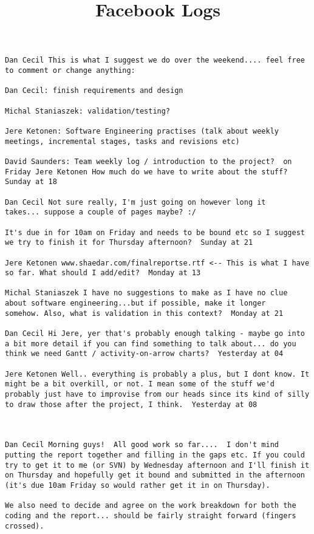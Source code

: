 \documentclass[10pt]{report}
\title{Facebook Logs}
\begin{document}
\maketitle
\begin{verbatim}
Dan Cecil This is what I suggest we do over the weekend.... feel free
to comment or change anything:

Dan Cecil: finish requirements and design

Michal Staniaszek: validation/testing?

Jere Ketonen: Software Engineering practises (talk about weekly
meetings, incremental stages, tasks and revisions etc)

David Saunders: Team weekly log / introduction to the project?  on
Friday Jere Ketonen How much do we have to write about the stuff?
Sunday at 18
 
Dan Cecil Not sure really, I'm just going on however long it
takes... suppose a couple of pages maybe? :/

It's due in for 10am on Friday and needs to be bound etc so I suggest
we try to finish it for Thursday afternoon?  Sunday at 21

Jere Ketonen www.shaedar.com/finalreportse.rtf <-- This is what I have
so far. What should I add/edit?  Monday at 13

Michal Staniaszek I have no suggestions to make as I have no clue
about software engineering...but if possible, make it longer
somehow. Also, what is validation in this context?  Monday at 21

Dan Cecil Hi Jere, yer that's probably enough talking - maybe go into
a bit more detail if you can find something to talk about... do you
think we need Gantt / activity-on-arrow charts?  Yesterday at 04

Jere Ketonen Well.. everything is probably a plus, but I dont know. It
might be a bit overkill, or not. I mean some of the stuff we'd
probably just have to improvise from our heads since its kind of silly
to draw those after the project, I think.  Yesterday at 08



Dan Cecil Morning guys!  All good work so far....  I don't mind
putting the report together and filling in the gaps etc. If you could
try to get it to me (or SVN) by Wednesday afternoon and I'll finish it
on Thursday and hopefully get it bound and submitted in the afternoon
(it's due 10am Friday so would rather get it in on Thursday).

We also need to decide and agree on the work breakdown for both the
coding and the report... should be fairly straight forward (fingers
crossed).


\end{verbatim}
\end{document}
